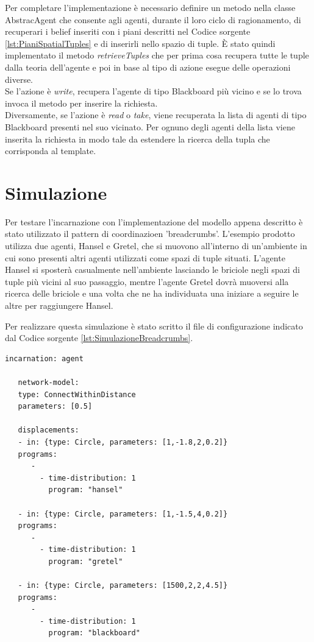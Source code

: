 \documentclass[12pt,a4paper,openright,twoside]{report}
\begin{document}
Per completare l'implementazione \`e necessario definire un metodo nella classe AbstracAgent che consente agli agenti, durante il loro ciclo di ragionamento, di recuperari i belief inseriti con i piani descritti nel Codice sorgente \ref{lst:PianiSpatialTuples} e di inserirli nello spazio di tuple. \`E stato quindi implementato il metodo \textit{retrieveTuples} che per prima cosa recupera tutte le tuple dalla teoria dell'agente e poi in base al tipo di azione esegue delle operazioni diverse.
\\
Se l'azione \`e \textit{write}, recupera l'agente di tipo Blackboard pi\`u vicino e se lo trova invoca il metodo per inserire la richiesta.
\\
Diversamente, se l'azione \`e \textit{read} o \textit{take}, viene recuperata la lista di agenti di tipo Blackboard presenti nel suo vicinato. Per ognuno degli agenti della lista viene inserita la richiesta in modo tale da estendere la ricerca della tupla che corrisponda al template.

\section{Simulazione}
Per testare l'incarnazione con l'implementazione del modello appena descritto \`e stato utilizzato il pattern di coordinazioen 'breadcrumbs'. L'esempio prodotto utilizza due agenti, Hansel e Gretel, che si muovono all'interno di un'ambiente in cui sono presenti altri agenti utilizzati come spazi di tuple situati. L'agente Hansel si sposter\`a casualmente nell'ambiente lasciando le briciole negli spazi di tuple pi\`u vicini al suo passaggio, mentre l'agente Gretel dovr\`a muoversi alla ricerca delle briciole e una volta che ne ha individuata una iniziare a seguire le altre per raggiungere Hansel.

Per realizzare questa simulazione \`e stato scritto il file di configurazione indicato dal Codice sorgente \ref{lst:SimulazioneBreadcrumbs}.
\medskip
\begin{lstlisting}[firstnumber=1,label={lst:SimulazioneBreadcrumbs},caption={Simulazione modello Spatial Tuples con modello di coordinazione breadcrumbs}]
   incarnation: agent

   network-model:
   type: ConnectWithinDistance
   parameters: [0.5]

   displacements:
   - in: {type: Circle, parameters: [1,-1.8,2,0.2]}
   programs:
      -
        - time-distribution: 1
          program: "hansel"

   - in: {type: Circle, parameters: [1,-1.5,4,0.2]}
   programs:
      -
        - time-distribution: 1
          program: "gretel"

   - in: {type: Circle, parameters: [1500,2,2,4.5]}
   programs:
      -
        - time-distribution: 1
          program: "blackboard"
\end{lstlisting}
\end{document}
